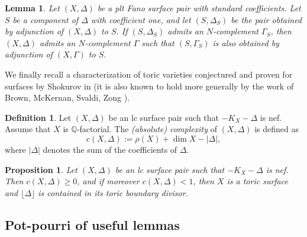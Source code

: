 \documentclass{amsart}
\newcommand{\qq}{\mathbb{Q}}
\newtheorem{lemma}[theorem]{Lemma}
\newtheorem{proposition}[theorem]{Proposition}
\theoremstyle{definition}
\newtheorem{definition}[theorem]{Definition}
\theoremstyle{remark}
\numberwithin{equation}{section}
\begin{document}
\begin{lemma}\label{lem:lifting-complements} 
Let $(X,\Delta)$ be a plt Fano surface pair with standard coefficients.
Let $S$ be a component of $\Delta$ with coefficient one, and let $(S,\Delta_S)$ be the pair obtained by adjunction of $(X,\Delta)$ to $S$. 
If $(S,\Delta_S)$ admits an $N$-complement $\Gamma_S$, 
then $(X,\Delta)$ admits an $N$-complement $\Gamma$ such that $(S,\Gamma_S)$ is also obtained by adjunction of $(X,\Gamma)$ to $S$.
\end{lemma}


We finally recall a characterization 
of toric varieties conjectured and proven for surfaces by Shokurov in \cite[Theorem 6.4]{Sho00} (it is also known to hold more generally by the work of Brown, McKernan, Svaldi, Zong \cite[Theorem 1.2]{BMSZ18}).

\begin{definition}
\label{def:complexity}
Let $(X,\Delta)$ be an lc surface pair such that $-K_X-\Delta$ is nef. Assume that $X$ is $\qq$-factorial.
The {\em (absolute) complexity} of $(X,\Delta)$ is defined as
\[
c(X,\Delta):=\rho(X)+\dim X - |\Delta|,
\]
where $|\Delta|$ denotes the sum of the coefficients of $\Delta$. 
\end{definition}

\begin{proposition}\label{prop:toric-characterization}
Let $(X,\Delta)$ be an lc surface pair such that $-K_X-\Delta$ is nef.
Then $c(X,\Delta)\geq 0$, and if moreover $c(X,\Delta)<1$, then $X$ is a toric surface and $\lfloor\Delta \rfloor
$ is contained in its toric boundary divisor. 
\end{proposition}


\subsection{Pot-pourri of useful lemmas}
\end{document}

